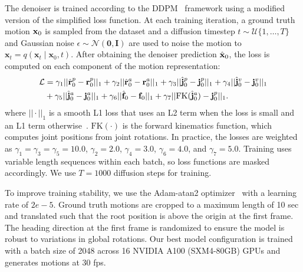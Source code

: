 The denoiser is trained according to the DDPM~\cite{ho2020denoising} framework using a modified version of the simplified loss function. At each training iteration, a ground truth motion $\mathbf{x}_0$ is sampled from the dataset and a diffusion timestep $t \sim \mathcal{U}\{1,\dots,T\}$ and Gaussian noise $\epsilon \sim \mathcal{N}(\mathbf{0}, \mathbf{I})$ are used to noise the motion to $\mathbf{x}_t = q(\mathbf{x}_t \mid \mathbf{x}_0, t)$. After obtaining the denoiser prediction $\hat{\mathbf{x}}_0$, the loss is computed on each component of the motion representation:
\begin{align}
    \mathcal{L} &= \gamma_1 || \hat{\mathbf{r}}^p_0 - \mathbf{r}^p_0||_1 + \gamma_2 || \hat{\mathbf{r}}^a_0 - \mathbf{r}^a_0||_1 + \gamma_3 || \hat{\mathbf{j}}^p_0 - \mathbf{j}^p_0||_1 + \gamma_4 || \hat{\mathbf{j}}^v_0 - \mathbf{j}^v_0||_1 \notag \\
    &+ \gamma_5 || \hat{\mathbf{j}}^a_0 - \mathbf{j}^a_0||_1 + \gamma_6 || \hat{\mathbf{f}}_0 - \mathbf{f}_0||_1 + \gamma_7 || \text{FK}(\hat{\mathbf{j}}^a_0) - \mathbf{j}^p_0||_1.
\end{align}
where $||\cdot||_1$ is a smooth L1 loss that uses an L2 term when the loss is small and an L1 term otherwise~\cite{girshick2015fast}. $\text{FK}(\cdot)$ is the forward kinematics function, which computes joint positions from joint rotations. 
In practice, the losses are weighted as $\gamma_1 = \gamma_3 = \gamma_5 = 10.0$, $\gamma_2 = 2.0$, $\gamma_4 = 3.0$, $\gamma_6 = 4.0$, and $\gamma_7 = 5.0$. 
Training uses variable length sequences within each batch, so loss functions are masked accordingly. %
We use $T=1000$ diffusion steps for training.






To improve training stability, we use the Adam-atan2 optimizer~\cite{everett2024scaling} with a learning rate of $2e{-}5$. 
Ground truth motions are cropped to a maximum length of 10 sec and translated such that the root position is above the origin at the first frame. The heading direction at the first frame is randomized to ensure the model is robust to variations in global rotations. 
Our best model configuration is trained with a batch size of 2048 across 16 NVIDIA A100 (SXM4-80GB) GPUs and generates motions at 30 fps.

